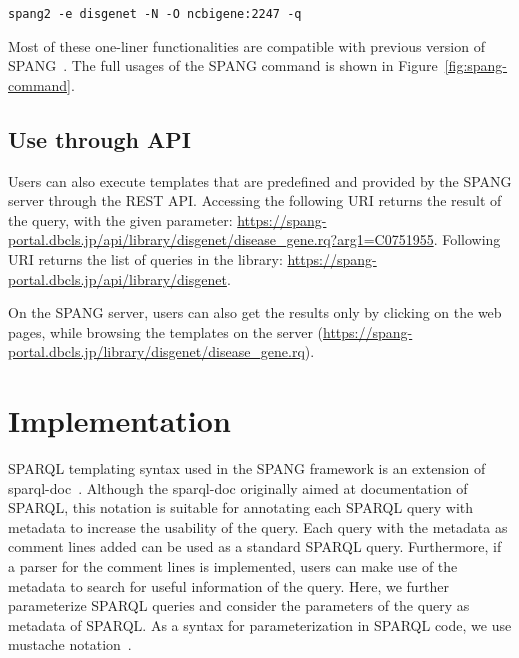 \documentclass[runningheads]{llncs}
\begin{document}
\texttt{spang2 -e disgenet -N -O ncbigene:2247 -q}

\noindent Most of these one-liner functionalities are compatible with previous version of SPANG~\cite{spang}. The full usages of the SPANG command is shown in Figure~\ref{fig:spang-command}.



\subsection{Use through API}


Users can also execute templates that are predefined and provided by the SPANG server through the REST API.
Accessing the following URI returns the result of the query, with the given parameter:
\url{https://spang-portal.dbcls.jp/api/library/disgenet/disease_gene.rq?arg1=C0751955}. Following URI returns the list of queries in the library: \url{https://spang-portal.dbcls.jp/api/library/disgenet}.


On the SPANG server, users can also get the results only by clicking on the web pages, while browsing the templates on the server (\url{https://spang-portal.dbcls.jp/library/disgenet/disease_gene.rq}). 



\section{Implementation}

SPARQL templating syntax used in the SPANG framework is an extension of sparql-doc~\cite{sparql-doc}. Although the sparql-doc originally aimed at documentation of SPARQL, this notation is suitable for annotating each SPARQL query with metadata to increase the usability of the query. Each query with the metadata as comment lines added can be used as a standard SPARQL query. Furthermore, if a parser for the comment lines is implemented, users can make use of the metadata to search for useful information of the query.
Here, we further parameterize SPARQL queries and consider the parameters of the query as metadata of SPARQL.
As a syntax for parameterization in SPARQL code, we use mustache notation~\cite{mustache}.
\end{document}
